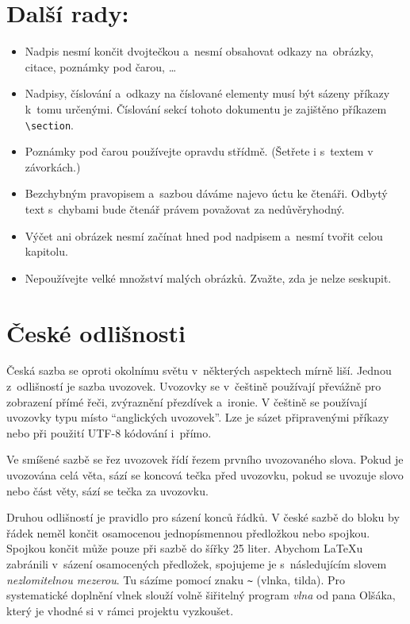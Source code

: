 \documentclass[hidelinks, 10pt, twocolumn]{article}
\begin{document}
\section{Další rady:}
\begin{itemize}
    \item Nadpis nesmí končit dvojtečkou a~nesmí obsahovat odkazy na~obrázky, citace, poznámky pod čarou, \dots
    
    \item Nadpisy, číslování a~odkazy na číslované elementy musí být sázeny příkazy k~tomu určenými.
    Číslování sekcí tohoto dokumentu je zajištěno příkazem \verb|\section|.
    
    \item Poznámky pod čarou\footnotemark{} používejte opravdu střídmě.
    (Šetřete i s~textem v závorkách.)
    
    
    \item Bezchybným pravopisem a~sazbou dáváme najevo úctu ke čtenáři.
    Odbytý text s~chybami bude čtenář právem považovat za nedůvěryhodný.
    
    \item Výčet ani obrázek nesmí začínat hned pod nadpisem a~nesmí tvořit celou kapitolu.
    
    \item Nepoužívejte velké množství malých obrázků.
    Zvažte, zda je nelze seskupit.
\end{itemize}

\section{České odlišnosti}

Česká sazba se oproti okolnímu světu v~některých aspektech mírně liší.
Jednou z~odlišností je sazba uvozovek.
Uvozovky se v~češtině používají převážně pro zobrazení přímé řeči, zvýraznění přezdívek a~ironie.
V češtině se používají uvozovky typu  místo ``anglických uvozovek''.
Lze je sázet připravenými příkazy nebo při použití UTF-8 kódování i~přímo.
\par
Ve smíšené sazbě se řez uvozovek řídí řezem prvního uvozovaného slova.
Pokud je uvozována celá věta, sází se koncová tečka před uvozovku, pokud se uvozuje slovo nebo část věty, sází se tečka za uvozovku.
\par
Druhou odlišností je pravidlo pro sázení konců řádků.
V české sazbě do bloku by řádek neměl končit osamocenou jednopísmennou předložkou nebo spojkou.
Spojkou  končit může pouze při sazbě do šířky 25 liter.
Abychom \LaTeX{}u zabránili v~sázení osamocených předložek, spojujeme je s~následujícím slovem \textit{nezlomitelnou mezerou}.
Tu sázíme pomocí znaku \verb|~| (vlnka, tilda).
Pro systematické doplnění vlnek slouží volně šiřitelný program \textit{vlna} od pana Olšáka\footnotemark{}, který je vhodné si v rámci projektu vyzkoušet.
\par
\end{document}
